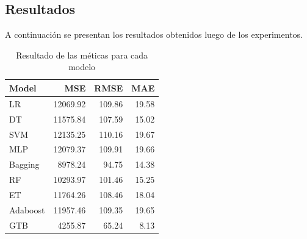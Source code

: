 \documentclass[spanish]{article}
\begin{document}
        
      \subsection{Resultados}
      

        A continuación se presentan los resultados obtenidos luego de los experimentos.

        \clearpage

        \begin{table}[!ht]
          \centering
          \caption{Resultado de las méticas para cada modelo}
          \label{tab:results}
          \begin{tabular}{l|rrr}
            \hline
            Model    & MSE   & RMSE & MAE \\ \hline \hline
            LR       & 12069.92 & 109.86 & 19.58 \\
            DT       & 11575.84 & 107.59 & 15.02 \\
            SVM      & 12135.25 & 110.16 & 19.67 \\
            MLP      & 12079.37 & 109.91 & 19.66 \\
            Bagging  & 8978.24  & 94.75  & 14.38 \\
            RF       & 10293.97 & 101.46 & 15.25 \\ 
            ET       & 11764.26 & 108.46 & 18.04 \\
            Adaboost & 11957.46 & 109.35 & 19.65 \\
            GTB      & 4255.87  & 65.24  & 8.13  \\ \hline
          \end{tabular}
        \end{table}        
\end{document}
